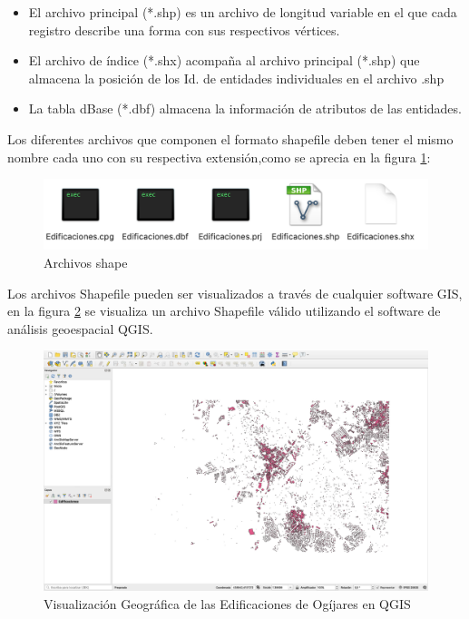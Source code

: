 \begin{enumerate}
	\begin{itemize}
		\item El archivo principal (*.shp) es un archivo de longitud variable en el que cada registro describe una forma con sus respectivos vértices. 
		\item El archivo de índice (*.shx) acompaña al archivo principal (*.shp) que almacena la posición de los Id. de entidades individuales en el archivo .shp 
		\item La tabla dBase (*.dbf) almacena la información  de atributos de las entidades. 
	\end{itemize}	

	Los diferentes archivos que componen el formato shapefile deben tener el mismo nombre cada uno con su respectiva extensión,como se aprecia en la figura \ref{fig:shapefile}:
	
	\begin{figure}[H]
		\centering
		\includegraphics[width=1\linewidth]{imagenes/capitulo2/shapefile}
		\caption{Archivos shape}
		\label{fig:shapefile}
	\end{figure}
	
	Los archivos Shapefile pueden ser visualizados a través de cualquier software GIS, en la figura \ref{fig:visualizar-shapefile} se visualiza un archivo Shapefile válido utilizando el software de análisis geoespacial QGIS. 
	
	\begin{figure}[H]
		\centering
		\includegraphics[width=1\linewidth]{imagenes/capitulo2/visualizar-shapefile}
		\caption{ Visualización Geográfica de las Edificaciones de Ogíjares en QGIS}
		\label{fig:visualizar-shapefile}
	\end{figure}

\end{enumerate}











